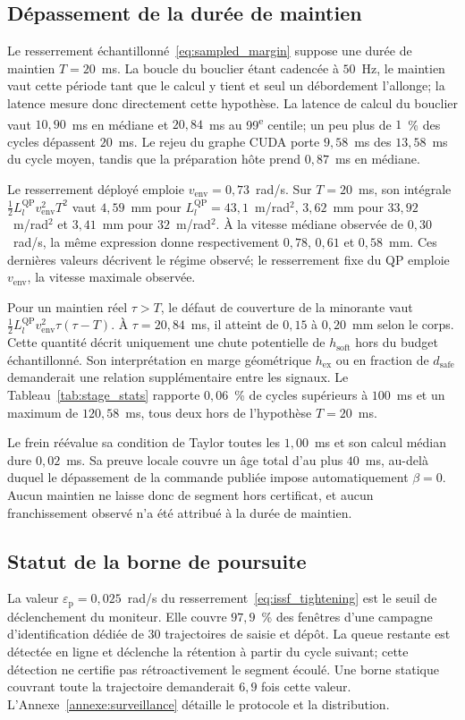 \subsection*{Dépassement de la durée de maintien}
Le resserrement échantillonné~\eqref{eq:sampled_margin} suppose une durée de maintien $T=20$~ms. La boucle du bouclier étant cadencée à $50$~Hz, le maintien vaut cette période tant que le calcul y tient et seul un débordement l'allonge; la latence mesure donc directement cette hypothèse. La latence de calcul du bouclier vaut $10{,}90$~ms en médiane et $20{,}84$~ms au 99\textsuperscript{e} centile; un peu plus de $1$~\% des cycles dépassent $20$~ms. Le rejeu du graphe \ac{CUDA} porte $9{,}58$~ms des $13{,}58$~ms du cycle moyen, tandis que la préparation hôte prend $0{,}87$~ms en médiane.

Le resserrement déployé emploie $v_{\mathrm{env}}=0{,}73$~rad/s. Sur $T=20$~ms, son intégrale $\tfrac{1}{2}L_l^{\mathrm{QP}}v_{\mathrm{env}}^2T^2$ vaut $4{,}59$~mm pour $L_l^{\mathrm{QP}}=43{,}1$~m/rad$^2$, $3{,}62$~mm pour $33{,}92$~m/rad$^2$ et $3{,}41$~mm pour $32$~m/rad$^2$. À la vitesse médiane observée de $0{,}30$~rad/s, la même expression donne respectivement $0{,}78$, $0{,}61$ et $0{,}58$~mm. Ces dernières valeurs décrivent le régime observé; le resserrement fixe du \ac{QP} emploie $v_{\mathrm{env}}$, la vitesse maximale observée.

Pour un maintien réel $\tau>T$, le défaut de couverture de la minorante vaut $\tfrac{1}{2}L_l^{\mathrm{QP}}v_{\mathrm{env}}^2\tau(\tau-T)$. À $\tau=20{,}84$~ms, il atteint de $0{,}15$ à $0{,}20$~mm selon le corps. Cette quantité décrit uniquement une chute potentielle de $h_{\mathrm{soft}}$ hors du budget échantillonné. Son interprétation en marge géométrique $h_{\mathrm{ex}}$ ou en fraction de $d_{\mathrm{safe}}$ demanderait une relation supplémentaire entre les signaux. Le Tableau~\ref{tab:stage_stats} rapporte $0{,}06$~\% de cycles supérieurs à $100$~ms et un maximum de $120{,}58$~ms, tous deux hors de l'hypothèse $T=20$~ms.

Le frein réévalue sa condition de Taylor toutes les $1{,}00$~ms et son calcul médian dure $0{,}02$~ms. Sa preuve locale couvre un âge total d'au plus $40$~ms, au-delà duquel le dépassement de la commande publiée impose automatiquement $\beta=0$. Aucun maintien ne laisse donc de segment hors certificat, et aucun franchissement observé n'a été attribué à la durée de maintien.

\subsection*{Statut de la borne de poursuite}
La valeur $\varepsilon_{\mathrm{p}}=0{,}025$~rad/s du resserrement~\eqref{eq:issf_tightening} est le seuil de déclenchement du moniteur. Elle couvre $97{,}9$~\% des fenêtres d'une campagne d'identification dédiée de $30$ trajectoires de saisie et dépôt. La queue restante est détectée en ligne et déclenche la rétention à partir du cycle suivant; cette détection ne certifie pas rétroactivement le segment écoulé. Une borne statique couvrant toute la trajectoire demanderait $6{,}9$ fois cette valeur. L'Annexe~\ref{annexe:surveillance} détaille le protocole et la distribution.

